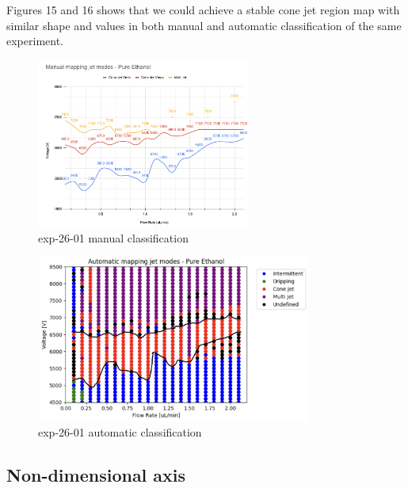         Figures 15 and 16 shows that we could achieve a stable cone jet region map with similar shape and values in both manual and automatic classification of the same experiment.


        \begin{multicols}{2}


            \begin{figure}[H]
                \center
                \includegraphics[width=7cm]{Figuras/report4/map7-manual.png}
                \caption{ exp-26-01 manual classification}
            \end{figure}

            \begin{figure}[H]
                \center
                \includegraphics[width=9cm]{Figuras/report4/map7-automatic-line.png}
                \caption{ exp-26-01 automatic classification}
            \end{figure}


        \end{multicols}

        \subsection{Non-dimensional axis}

